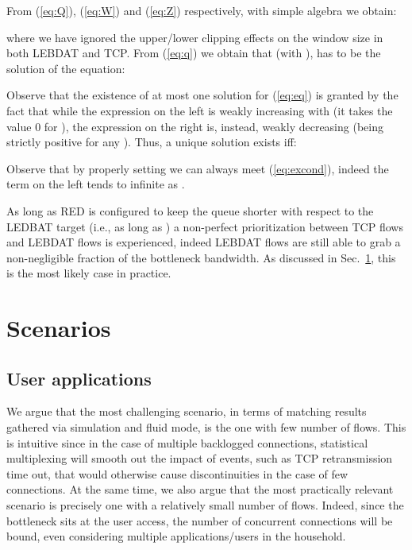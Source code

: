 \documentclass[conference]{IEEEtran}
\newcommand{\secR}[1]{Sec.~\ref{sec:#1}}
\newcommand{\secL}[1]{\label{sec:#1}}
\begin{document}
From (\ref{eq:Q}), (\ref{eq:W}) and (\ref{eq:Z}) respectively, with simple algebra we obtain:

\noindent where we have ignored the upper/lower clipping effects on the window size in both LEBDAT and TCP.
From (\ref{eq:q}) we obtain that  (with ), has to be the solution of the equation:

Observe that the existence of at most one solution for (\ref{eq:eq}) is granted by the fact that while the expression on the left is weakly increasing with  (it takes the value 0 for ),  the expression on the right is, instead, weakly decreasing (being strictly positive for any ). Thus, a unique solution exists iff:

Observe that by properly setting  we can always meet (\ref{eq:excond}), indeed the term on the left tends to infinite as .

As long as RED is configured to keep the queue shorter with respect to the LEDBAT target (i.e., as long as ) a non-perfect prioritization between TCP flows and LEBDAT flows is experienced, indeed LEBDAT flows are still able to grab a non-negligible fraction of the bottleneck bandwidth.  As discussed in \secR{scenario}, this is the most likely case in practice.


\section{Scenarios}\secL{scenario}

\subsection{User applications}
We argue that the most challenging scenario, in terms of matching results gathered via simulation and fluid mode, is the one with few number of flows. This is intuitive since in the case of multiple backlogged connections, statistical multiplexing will smooth out the impact of events, such as TCP retransmission time out, that would otherwise cause discontinuities in the case of few connections. At the same time, we also argue that the most practically relevant scenario is precisely one with a relatively small number of flows. Indeed, since the bottleneck sits at the user access, the number of concurrent connections will be bound, even considering multiple applications/users in the household.
\end{document}
